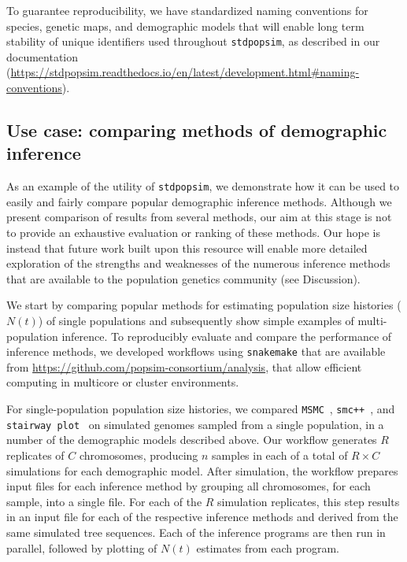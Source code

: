 \documentclass[12pt,halfline,a4paper]{ouparticle}
\newcommand{\stdpopsim}{\texttt{stdpopsim}\xspace}
\newcommand{\MSMC}{\texttt{MSMC}\xspace}
\newcommand{\smcpp}{\texttt{smc++}\xspace}
\newcommand{\stairwayplot}{\texttt{stairway plot}\xspace}
\begin{document}
To guarantee reproducibility,
we have standardized naming
conventions for species, genetic maps, and demographic models that will enable long term stability
of unique identifiers used throughout \stdpopsim,
as described in our documentation
(\url{https://stdpopsim.readthedocs.io/en/latest/development.html#naming-conventions}).


\subsection*{Use case: comparing methods of demographic inference}

As an example of the utility of \stdpopsim, we demonstrate how it can be used
to easily and fairly compare popular demographic inference methods.
Although we present comparison of results from several
methods, our aim at this stage is not to provide an exhaustive
evaluation or ranking of these methods. Our hope is instead that future work built upon this resource
will enable more detailed exploration of the strengths and weaknesses of the numerous
inference methods that are available to the population genetics community
(see Discussion).

We start by comparing popular methods for estimating
population size histories ($N(t)$) of single populations and subsequently
show simple examples of multi-population inference.
To reproducibly evaluate and compare the performance of inference methods, we developed
workflows using \texttt{snakemake} \citep{koster2012snakemake}
that are available from \url{https://github.com/popsim-consortium/analysis},
that allow efficient computing in multicore or cluster environments.

For single-population population size histories, we compared
\MSMC~\citep{schiffels2014inferring}, \smcpp~\citep{terhorst2017robust}, and
\stairwayplot~\citep{liu2015exploring}
 on simulated genomes sampled from a single population,
in a number of the demographic models described above.
Our workflow generates $R$ replicates of $C$ chromosomes, producing $n$ samples in each of a total of $R \times C$
simulations for each demographic model. After simulation, the workflow prepares
input files for each inference method by grouping all
chromosomes, for each sample, into a single file. For each of the $R$ simulation replicates, this step results in an
input file for each of the
respective inference methods and derived from the same simulated tree sequences.
Each of the inference programs are then run in parallel, followed by plotting of
$N(t)$ estimates from each program.
\end{document}
